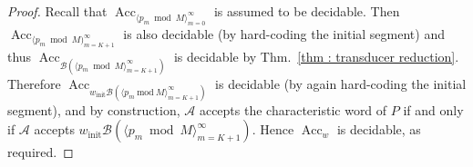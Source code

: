\documentclass[10pt,a4paper]{amsart}
\newcommand{\Acc} {\operatorname{Acc}}
\begin{document}
\begin{proof}
    Recall that $\Acc_{\langle p_m\bmod M\rangle_{m=0}^\infty}$ is assumed to be decidable. 
    Then $\Acc_{\langle p_m\bmod M)_{m=K+1}^\infty}$ is also
    decidable (by hard-coding the initial segment) and thus
    $\Acc_{\mathcal{B}(\langle p_m\bmod M\rangle_{m=K+1}^\infty)}$ is decidable by Thm.~\ref{thm : transducer reduction}.
    Therefore $\Acc_{w_\text{init}\mathcal{B}(\langle p_m\
      \mathrm{mod}\ M\rangle_{m=K+1}^\infty)}$ is decidable (by again
    hard-coding the initial segment), and by construction, $\mathcal{A}$ accepts
    the characteristic word of $P$ if and only if $\mathcal{A}$
    accepts $w_\text{init}\mathcal{B}(\langle p_m\bmod M\rangle_{m=K+1}^\infty)$. 
    Hence $\Acc_w$ is decidable, as required.
\end{proof}
\end{document}
